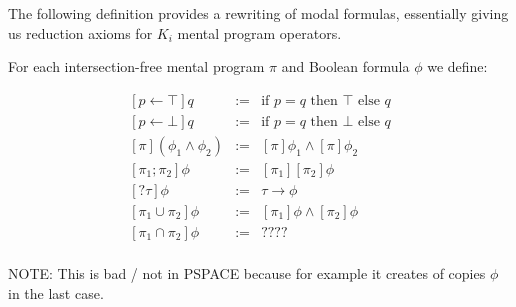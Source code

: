 


The following definition provides a rewriting of modal formulas, essentially giving us reduction axioms for $K_i$ mental program operators.

\begin{defi}

For each intersection-free mental program $\pi$ and Boolean formula $\phi$ we define:

\href{https://github.com/m4lvin/SucExpModelCheckers/blob/9c5bc0044b33ff4ce96417d493793bfbab2b258a/src/SucModelChecker.hs#L178}{}

\[
  \begin{array}{lcl} %
    {}[ p \leftarrow \top ] q     & := & \text{if $p=q$ then $\top$ else $q$} \\
    {}[ p \leftarrow \bot ] q     & := & \text{if $p=q$ then $\bot$ else $q$} \\
    {}[\pi] (\phi_1 \land \phi_2) & := & [\pi] \phi_1 \land [\pi] \phi_2      \\
    {}[\pi_1;\pi_2] \phi          & := & [\pi_1] [\pi_2] \phi                 \\
    {}[?\tau] \phi                & := & \tau \to \phi                       \\
    {}[\pi_1 \cup \pi_2] \phi     & := & [\pi_1] \phi \land [\pi_2] \phi      \\
    {}[\pi_1 \cap \pi_2] \phi     & := & ???? \\
  \end{array}
\]
\end{defi}
NOTE: This is bad / not in PSPACE because for example it creates of copies $\phi$ in the last case.
